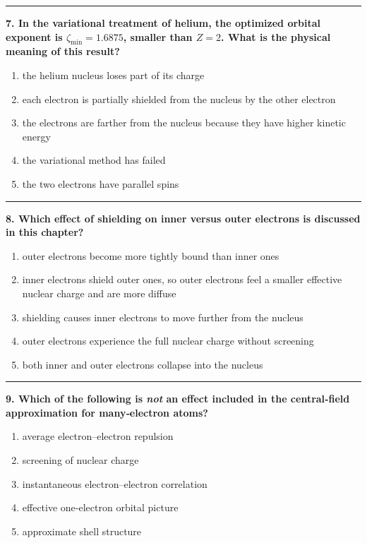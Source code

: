 \documentclass[
  english,
  9pt,
]{extbook}
\providecommand{\tightlist}{%
  \setlength{\itemsep}{0pt}\setlength{\parskip}{0pt}}
\theoremstyle{definition}
\theoremstyle{definition}
\theoremstyle{definition}
\theoremstyle{definition}
\theoremstyle{remark}
\begin{document}
\begin{center}\rule{0.5\linewidth}{0.5pt}\end{center}

\textbf{7. In the variational treatment of helium, the optimized orbital exponent is \(\zeta_\text{min}=1.6875\), smaller than \(Z=2\). What is the physical meaning of this result?}

\begin{enumerate}
\def\labelenumi{\alph{enumi}.}
\tightlist
\item
  the helium nucleus loses part of its charge
\item
  each electron is partially shielded from the nucleus by the other electron
\item
  the electrons are farther from the nucleus because they have higher kinetic energy
\item
  the variational method has failed
\item
  the two electrons have parallel spins
\end{enumerate}

\begin{center}\rule{0.5\linewidth}{0.5pt}\end{center}

\textbf{8. Which effect of shielding on inner versus outer electrons is discussed in this chapter?}

\begin{enumerate}
\def\labelenumi{\alph{enumi}.}
\tightlist
\item
  outer electrons become more tightly bound than inner ones
\item
  inner electrons shield outer ones, so outer electrons feel a smaller effective nuclear charge and are more diffuse
\item
  shielding causes inner electrons to move further from the nucleus
\item
  outer electrons experience the full nuclear charge without screening
\item
  both inner and outer electrons collapse into the nucleus
\end{enumerate}

\begin{center}\rule{0.5\linewidth}{0.5pt}\end{center}

\textbf{9. Which of the following is \emph{not} an effect included in the central‑field approximation for many‑electron atoms?}

\begin{enumerate}
\def\labelenumi{\alph{enumi}.}
\tightlist
\item
  average electron--electron repulsion
\item
  screening of nuclear charge
\item
  instantaneous electron--electron correlation
\item
  effective one‑electron orbital picture
\item
  approximate shell structure
\end{enumerate}
\end{document}
